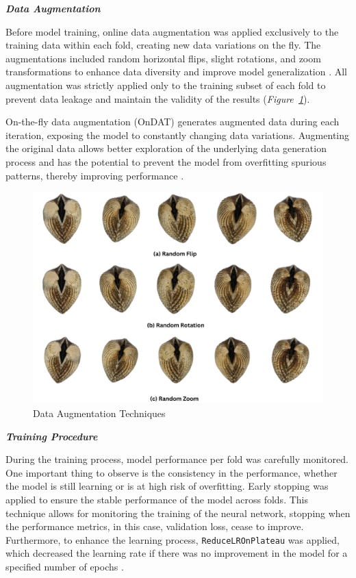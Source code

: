 \textbf{\textit{Data Augmentation}}

Before model training, online data augmentation was applied exclusively to the training data within each fold, creating new data variations on the fly. The augmentations included random horizontal flips, slight rotations, and zoom transformations to enhance data diversity and improve model generalization \cite{awan2022}. All augmentation was strictly applied only to the training subset of each fold to prevent data leakage and maintain the validity of the results (\textit{Figure~\ref{fig:data_augmentation}}). 

On-the-fly data augmentation (OnDAT) generates augmented data during each iteration, exposing the model to constantly changing data variations. Augmenting the original data allows better exploration of the underlying data generation process and has the potential to prevent the model from overfitting spurious patterns, thereby improving performance \cite{cerqueira2024}.

\begin{figure}[h]
	\centering
	\includegraphics[width=\textwidth]{figures/data_augmentation.png}
	\caption{Data Augmentation Techniques}
	\label{fig:data_augmentation}
\end{figure}

\textbf{\textit{Training Procedure}}

During the training process, model performance per fold was carefully monitored. One important thing to observe is the consistency in the performance, whether the model is still learning or is at high risk of overfitting. Early stopping was applied to ensure the stable performance of the model across folds. This technique allows for monitoring the training of the neural network, stopping when the performance metrics, in this case, validation loss, cease to improve. Furthermore, to enhance the learning process, \texttt{ReduceLROnPlateau} was applied, which decreased the learning rate if there was no improvement in the model for a specified number of epochs \cite{kerasTeam}.

